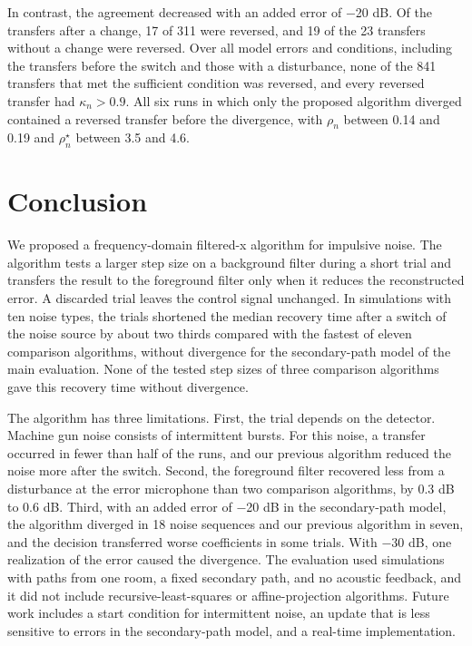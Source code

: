 \documentclass[sip,biber]{now-journal}
\begin{document}
In contrast, the agreement decreased with an added error of −20 dB. Of the transfers after a change, 17 of 311 were reversed, and 19 of the 23 transfers without a change were reversed. Over all model errors and conditions, including the transfers before the switch and those with a disturbance, none of the 841 transfers that met the sufficient condition was reversed, and every reversed transfer had \(\kappa_n > 0.9\). All six runs in which only the proposed algorithm diverged contained a reversed transfer before the divergence, with \(\rho_n\) between 0.14 and 0.19 and \(\rho^{\star}_n\) between 3.5 and 4.6.

\hypertarget{sec:9}{%
\section{Conclusion}\label{sec:9}}

We proposed a frequency-domain filtered-x algorithm for impulsive noise. The algorithm tests a larger step size on a background filter during a short trial and transfers the result to the foreground filter only when it reduces the reconstructed error. A discarded trial leaves the control signal unchanged. In simulations with ten noise types, the trials shortened the median recovery time after a switch of the noise source by about two thirds compared with the fastest of eleven comparison algorithms, without divergence for the secondary-path model of the main evaluation. None of the tested step sizes of three comparison algorithms gave this recovery time without divergence.

The algorithm has three limitations. First, the trial depends on the detector. Machine gun noise consists of intermittent bursts. For this noise, a transfer occurred in fewer than half of the runs, and our previous algorithm reduced the noise more after the switch. Second, the foreground filter recovered less from a disturbance at the error microphone than two comparison algorithms, by 0.3 dB to 0.6 dB. Third, with an added error of −20 dB in the secondary-path model, the algorithm diverged in 18 noise sequences and our previous algorithm in seven, and the decision transferred worse coefficients in some trials. With −30 dB, one realization of the error caused the divergence. The evaluation used simulations with paths from one room, a fixed secondary path, and no acoustic feedback, and it did not include recursive-least-squares or affine-projection algorithms. Future work includes a start condition for intermittent noise, an update that is less sensitive to errors in the secondary-path model, and a real-time implementation.
\end{document}
